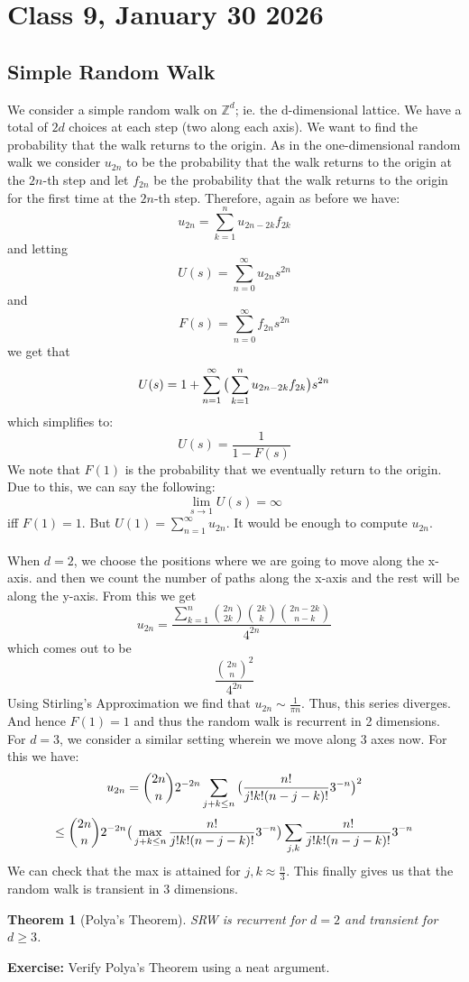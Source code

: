 \documentclass{article}
\newtheorem{theorem}{Theorem}
\begin{document}
\section*{Class 9, January 30 2026}
\subsection*{Simple Random Walk}
We consider a simple random walk on $\mathbb{Z}^d$; ie. the d-dimensional lattice. We have a total of $2d$ choices at each step (two along each axis).
We want to find the probability that the walk returns to the origin. 
As in the one-dimensional random walk we consider $u_{2n}$ to be the probability that the walk returns to the origin at the $2n$-th step and let $f_{2n}$ be the probability that the walk returns to the origin for the first time at the $2n$-th step.
Therefore, again as before we have:
$$u_{2n}=\sum_{k=1}^n u_{2n-2k}f_{2k}$$
and letting $$U(s)=\sum_{n=0}^{\infty}u_{2n}s^{2n}$$ and 
$$F(s)=\sum_{n=0}^{\infty}f_{2n}s^{2n}$$
we get that 
$$U(s)=1+\sum_{n=1}^{\infty}\big{(}\sum_{k=1}^n u_{2n-2k}f_{2k}\big{)}s^{2n}$$
which simplifies to:
$$U(s)=\frac{1}{1-F(s)}$$
We note that $F(1)$ is the probability that we eventually return to the origin. Due to this, we can say the following:
$$\lim_{s\to1}U(s)=\infty$$ 
iff $F(1)=1$. But $U(1)=\sum_{n=1}^{\infty}u_{2n}$. It would be enough to compute $u_{2n}$. \\ \\ 
When $d=2$, we choose the positions where we are going to move along the x-axis. and then we count the number of paths along the x-axis and the rest will be along the y-axis. From this we get 
$$u_{2n}=\frac{\sum_{k=1}^{n}\binom{2n}{2k}\binom{2k}{k}\binom{2n-2k}{n-k}}{4^{2n}}$$
which comes out to be $$\frac{\binom{2n}{n}^2}{4^{2n}}$$
Using Stirling's Approximation we find that $u_{2n}\sim \frac{1}{\pi n}$. Thus, this series diverges. And hence $F(1)=1$ and thus the random walk is recurrent in 2 dimensions.\\
For $d=3$, we consider a similar setting wherein we move along 3 axes now. 
For this we have:
$$u_{2n}=\binom{2n}{n}2^{-2n}\sum_{j+k\leq n}\big{(}\frac{n!}{j!k!(n-j-k)!}3^{-n}\big{)}^2$$
$$\leq \binom{2n}{n}2^{-2n}\big{(}\max_{j+k\leq n}\frac{n!}{j!k!(n-j-k)!}3^{-n}\big{)}\sum_{j,k}\frac{n!}{j!k!(n-j-k)!}3^{-n}$$
We can check that the max is attained for $j,k \approx \frac{n}{3}$. This finally gives us that the random walk is transient in 3 dimensions.
\begin{theorem}[Polya's Theorem]
    SRW is recurrent for $d=2$ and transient for $d\geq 3$.
    
\end{theorem}
\textbf{Exercise:} Verify Polya's Theorem using a neat argument.
\end{document}
